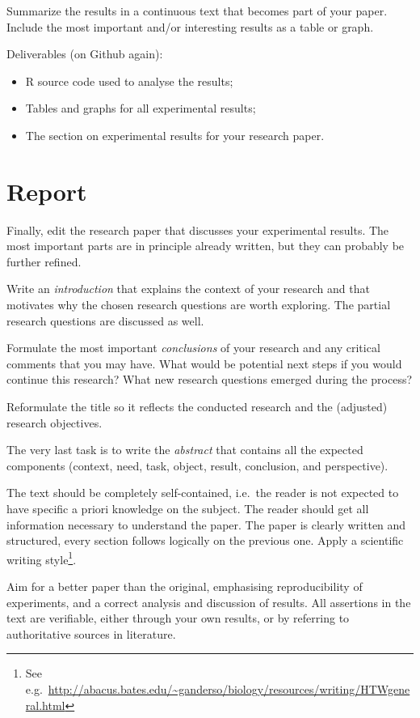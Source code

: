 \documentclass[fleqn,10pt]{artikeltin}
\begin{document}
Summarize the results in a continuous text that becomes part of your paper. Include the most important and/or interesting results as a table or graph.

Deliverables (on Github again):

\begin{itemize}
    \item R source code used to analyse the results;
	\item Tables and graphs for all experimental results;
	\item The section on experimental results for your research paper.
\end{itemize}

\section{Report}
\label{sec:report}

Finally, edit the research paper that discusses your experimental results. The most important parts are in principle already written, but they can probably be further refined.

Write an \emph{introduction} that explains the context of your research and that motivates why the chosen research questions are worth exploring. The partial research questions are discussed as well.

Formulate the most important \emph{conclusions} of your research and any critical comments that you may have. What would be potential next steps if you would continue this research? What new research questions emerged during the process?

Reformulate the title so it reflects the conducted research and the (adjusted) research objectives.

The very last task is to write the \emph{abstract} that contains all the expected components (context, need, task, object, result, conclusion, and perspective).

The text should be completely self-contained, i.e.~the reader is not expected to have specific a priori knowledge on the subject. The reader should get all information necessary to understand the paper. The paper is clearly written and structured, every section follows logically on the previous one. Apply a scientific writing style\footnote{See e.g.~\url{http://abacus.bates.edu/~ganderso/biology/resources/writing/HTWgeneral.html}}.

Aim for a better paper than the original, emphasising reproducibility of experiments, and a correct analysis and discussion of results. All assertions in the text are verifiable, either through your own results, or by referring to authoritative sources in literature.
\end{document}
